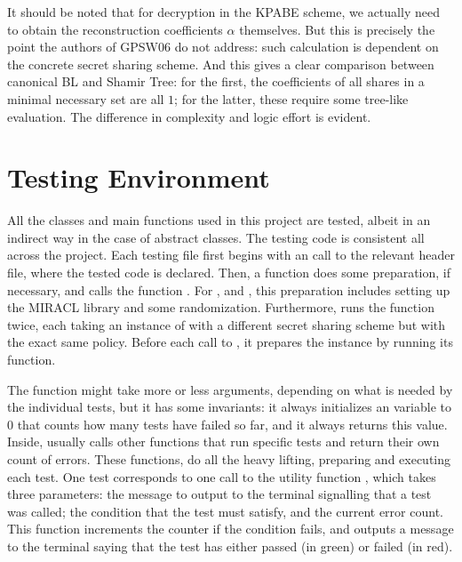 \documentclass{article}
\begin{document}
It should be noted that for decryption in the KPABE scheme, we actually need to obtain the reconstruction coefficients $\alpha$ themselves. But this is precisely the point the authors of GPSW06 do not address: such calculation is dependent on the concrete secret sharing scheme. And this gives a clear comparison between canonical BL and Shamir Tree: for the first, the coefficients of all shares in a minimal necessary set are all $1$; for the latter, these require some tree-like evaluation. The difference in complexity and logic effort is evident.


\section{Testing Environment}

All the classes and main functions used in this project are tested, albeit in an indirect way in the case of abstract classes. The testing code is consistent all across the project. Each testing file first begins with an  call to the relevant header file, where the tested code is declared. Then, a  function does some preparation, if necessary, and calls the function . For \ftkpabe, \ftblcanon and \ftshtree, this preparation includes setting up the MIRACL library and some randomization. Furthermore, \fckpabe runs the function  twice, each taking an instance of \cKPABE with a different secret sharing scheme but with the exact same policy. Before each call to , it prepares the \cKPABE instance by running its  function.

The function  might take more or less arguments, depending on what is needed by the individual tests, but it has some invariants: it always initializes an variable  to $0$ that counts how many tests have failed so far, and it always returns this value. Inside,  usually calls other functions that run specific tests and return their own count of errors. These functions, do all the heavy lifting, preparing and executing each test. One test corresponds to one call to the utility function , which takes three parameters: the message to output to the terminal signalling that a test was called; the condition that the test must satisfy, and the current error count. This function increments the counter if the condition fails, and outputs a message to the terminal saying that the test has either passed (in green) or failed (in red). 
\end{document}
